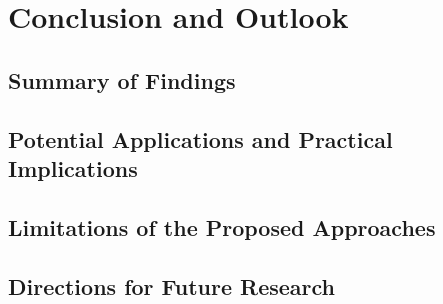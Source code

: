 \cleardoubleoddpage%
\chapter{Conclusion and Outlook}

\section{Summary of Findings}
\section{Potential Applications and Practical Implications}
\section{Limitations of the Proposed Approaches}
\section{Directions for Future Research}

